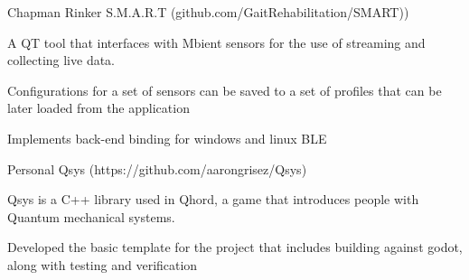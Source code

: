 


\begin{cventries}

  \cventry
    {Chapman Rinker} %
    {S.M.A.R.T ({\tiny github.com/GaitRehabilitation/SMART)})} %
    {} %
    {} %
    {
      \begin{cvitems} %
        \item {A QT tool that interfaces with Mbient sensors for the use of streaming and collecting live data.}
        \item{Configurations for a set of sensors can be saved to a set of profiles that can be later loaded from the application}
        \item{Implements back-end binding for windows and linux BLE}
      \end{cvitems}
    }


\cventry
    {Personal}
    {Qsys ({\tiny https://github.com/aarongrisez/Qsys})}
    {}
    {}
    {
     \begin{cvitems} %
        \item {Qsys is a C++ library used in Qhord, a game that introduces people with Quantum mechanical systems.}
        \item{Developed the basic template for the project that includes building against godot, along with testing and verification}
      \end{cvitems}
    }

\end{cventries}

